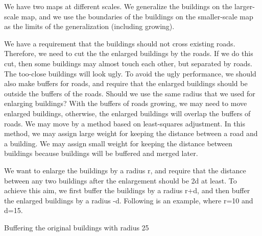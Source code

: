 \documentclass[graybox]{svmult}
\begin{document}
We have two maps at different scales. We generalize the 
buildings on the larger-scale map, and we use the boundaries of 
the buildings on the smaller-scale map as the limits of the 
generalization (including growing).


We have a requirement that the buildings should not cross 
existing roads. Therefore, we need to cut the the enlarged 
buildings by the roads. If we do this cut, then some buildings 
may almost touch each other, but separated by roads. The 
too-close buildings will look ugly. To avoid the ugly 
performance, we should also make buffers for roads, and require 
that the enlarged buildings should be outside the buffers of the 
roads. Should we use the same radius that we used for enlarging 
buildings? With the buffers of roads growing, we may need to 
move enlarged buildings, otherwise, the enlarged buildings will 
overlap the buffers of roads. 
We may move by a method based on least-squares adjustment. In 
this method, we may assign large weight for keeping the distance 
between a road and a building. We may assign small weight for 
keeping the distance between buildings because buildings will be 
buffered and merged later.

We want to enlarge the buildings by a radius r, and require that 
the distance between any two buildings after the enlargement 
should be 2d at least. To achieve this aim, we first buffer the 
buildings by a radius r+d, and then buffer the enlarged 
buildings by a radius -d. Following is an example, where r=10 
and d=15.

Buffering the original buildings with radius 25
\end{document}
